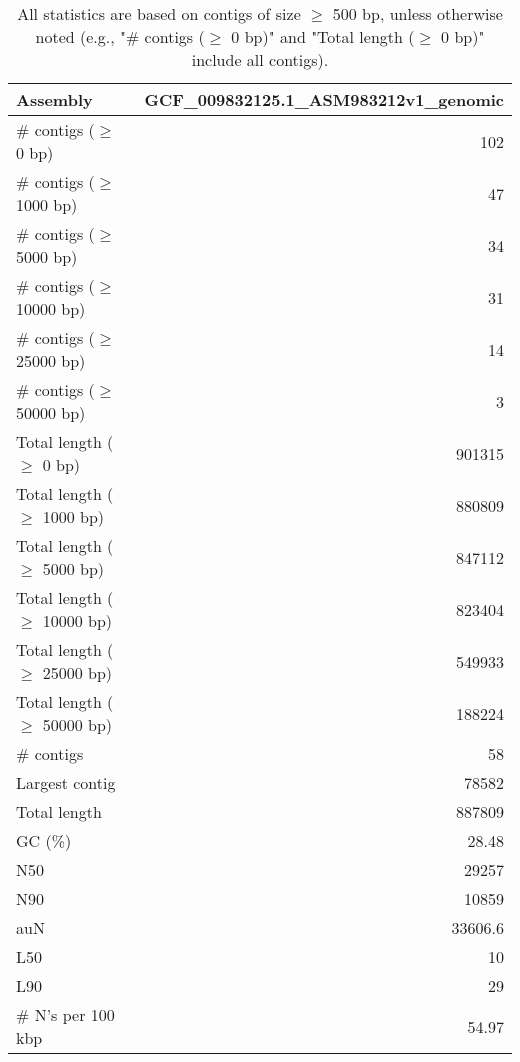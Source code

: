 \documentclass[12pt,a4paper]{article}
\begin{document}
\begin{table}[ht]
\begin{center}
\caption{All statistics are based on contigs of size $\geq$ 500 bp, unless otherwise noted (e.g., "\# contigs ($\geq$ 0 bp)" and "Total length ($\geq$ 0 bp)" include all contigs).}
\begin{tabular}{|l*{1}{|r}|}
\hline
Assembly & GCF\_009832125.1\_ASM983212v1\_genomic \\ \hline
\# contigs ($\geq$ 0 bp) & 102 \\ \hline
\# contigs ($\geq$ 1000 bp) & 47 \\ \hline
\# contigs ($\geq$ 5000 bp) & 34 \\ \hline
\# contigs ($\geq$ 10000 bp) & 31 \\ \hline
\# contigs ($\geq$ 25000 bp) & 14 \\ \hline
\# contigs ($\geq$ 50000 bp) & 3 \\ \hline
Total length ($\geq$ 0 bp) & 901315 \\ \hline
Total length ($\geq$ 1000 bp) & 880809 \\ \hline
Total length ($\geq$ 5000 bp) & 847112 \\ \hline
Total length ($\geq$ 10000 bp) & 823404 \\ \hline
Total length ($\geq$ 25000 bp) & 549933 \\ \hline
Total length ($\geq$ 50000 bp) & 188224 \\ \hline
\# contigs & 58 \\ \hline
Largest contig & 78582 \\ \hline
Total length & 887809 \\ \hline
GC (\%) & 28.48 \\ \hline
N50 & 29257 \\ \hline
N90 & 10859 \\ \hline
auN & 33606.6 \\ \hline
L50 & 10 \\ \hline
L90 & 29 \\ \hline
\# N's per 100 kbp & 54.97 \\ \hline
\end{tabular}
\end{center}
\end{table}
\end{document}
